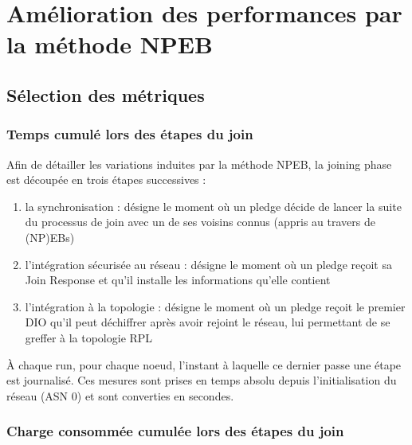 \documentclass[]{report}
\begin{document}
\newpage

\section{Amélioration des performances par la méthode NPEB}
\label{eval_NPEB}


\subsection{Sélection des métriques}

\subsubsection{Temps cumulé lors des étapes du join}
\label{metric_times}

Afin de détailler les variations induites par la méthode NPEB, la joining phase est découpée en trois étapes successives :
\begin{enumerate}
\item la synchronisation : désigne le moment où un pledge décide de lancer la suite du processus de join avec un de ses voisins connus (appris au travers de (NP)EBs)
\item l'intégration sécurisée au réseau : désigne le moment où un pledge reçoit sa Join Response et qu'il installe les informations qu'elle contient
\item l'intégration à la topologie : désigne le moment où un pledge reçoit le premier DIO qu'il peut déchiffrer après avoir rejoint le réseau, lui permettant de se greffer à la topologie RPL
\end{enumerate}
\vspace{0.2cm}
À chaque run, pour chaque noeud, l'instant à laquelle ce dernier passe une étape est journalisé. Ces mesures sont prises en temps absolu depuis l'initialisation du réseau (ASN 0) et sont converties en secondes.

\subsubsection{Charge consommée cumulée lors des étapes du join}
\end{document}
